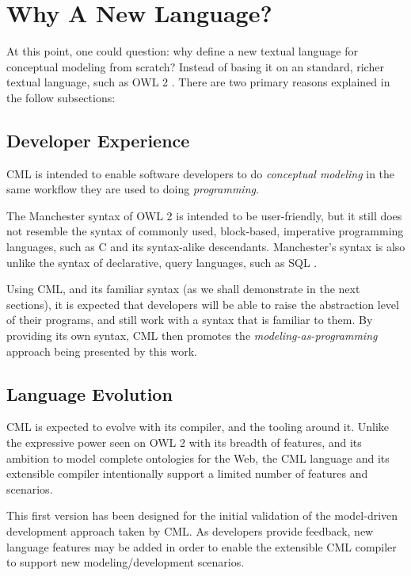 \section{Why A New Language?}\label{sec:why}

At this point, one could question: why define a new textual language for conceptual modeling from scratch? Instead of basing it on an standard, richer textual language, such as OWL 2 \cite{owl2}. There are two primary reasons explained in the follow subsections:

\subsection{Developer Experience}

CML is intended to enable software developers to do \emph{conceptual modeling} in the same workflow they are used to doing \emph{programming}.

The Manchester \cite{owl2manchester} syntax of OWL 2 is intended to be user-friendly,
but it still does not resemble the syntax of commonly used, block-based, imperative programming languages,
such as C \cite{clang} and its syntax-alike descendants.
Manchester's syntax is also unlike the syntax of declarative, query languages, such as SQL \cite{sql}.

Using CML,
and its familiar syntax (as we shall demonstrate in the next sections),
it is expected that developers will be able to raise the abstraction level of their programs,
and still work with a syntax that is familiar to them.
By providing its own syntax,
CML then promotes the \emph{modeling-as-programming} approach being presented by this work. 

\subsection{Language Evolution}

CML is expected to evolve with its compiler, and the tooling around it.
Unlike the expressive power seen on OWL 2 \cite{owl2} with its breadth of features,
and its ambition to model complete ontologies for the Web,
the CML language and its extensible compiler intentionally support a limited number of features and scenarios.

This first version has been designed for the initial validation of the model-driven development approach taken by CML.
As developers provide feedback,
new language features may be added in order to enable the extensible CML compiler to support new modeling/development scenarios.

